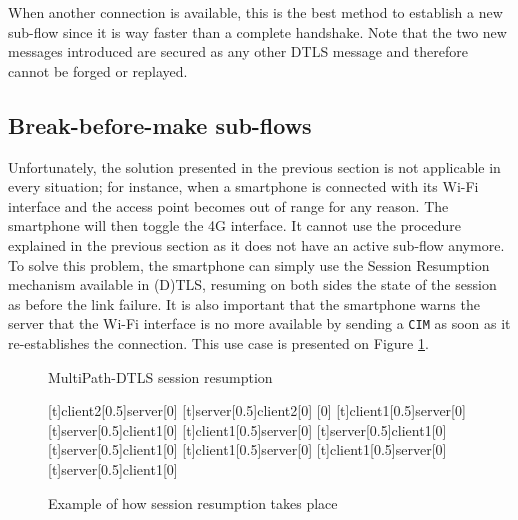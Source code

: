 When another connection is available, this is the best method to establish a new sub-flow since it is way faster than a complete handshake. Note that the two new messages introduced are secured as any other DTLS message and therefore cannot be forged or replayed.


\subsection{Break-before-make sub-flows\label{sec:breakbeforemake}}
Unfortunately, the solution presented in the previous section is not applicable in every situation; for instance, when a smartphone is connected with its Wi-Fi interface and the access point becomes out of range for any reason. The smartphone will then toggle the 4G interface. It cannot use the procedure explained in the previous section as it does not have an active sub-flow anymore. To solve this problem, the smartphone can simply use the Session Resumption mechanism available in (D)TLS, resuming on both sides the state of the session as before the link failure. It is also important that the smartphone warns the server that the Wi-Fi interface is no more available by sending a \texttt{CIM} as soon as it re-establishes the connection. This use case is presented on Figure \ref{fig:dtls-sessionresumption}.

\begin{figure}[!ht]
\centering
\begin{msc}[r]{MultiPath-DTLS session resumption}

\setlength{\instfootheight}{0em}
\setlength{\instheadheight}{0em}
\setlength{\instdist}{0.33\linewidth}
\setlength{\levelheight}{3em}


[t]{client2}[0.5]{server}[0]
\nextlevel
{}[t]{server}[0.5]{client2}[0]
\nextlevel
{}[0]
\nextlevel
{}
\nextlevel
{}
\nextlevel
{}[t]{client1}[0.5]{server}[0]
\nextlevel
{}[t]{server}[0.5]{client1}[0]
\nextlevel
{}[t]{client1}[0.5]{server}[0]
\nextlevel
{}[t]{server}[0.5]{client1}[0]
\nextlevel
{}[t]{server}[0.5]{client1}[0]
\nextlevel
{}[t]{client1}[0.5]{server}[0]
\nextlevel
{}[t]{client1}[0.5]{server}[0]
\nextlevel
{}[t]{server}[0.5]{client1}[0]
\nextlevel[2]

\end{msc}
\caption{Example of how session resumption takes place}
\label{fig:dtls-sessionresumption}
\end{figure}

